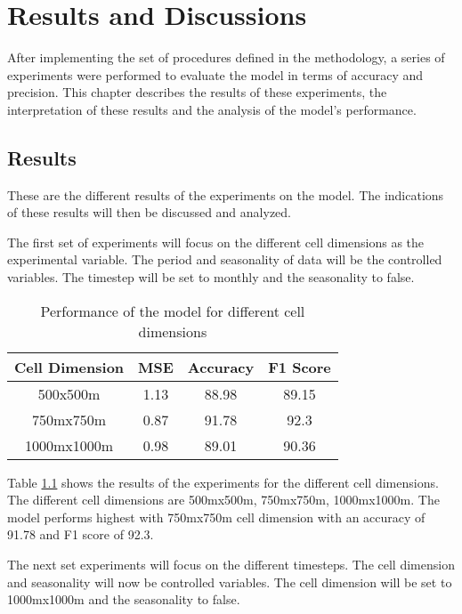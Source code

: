 \chapter{Results and Discussions}
    After implementing the set of procedures defined in the methodology, a series of experiments were performed to evaluate the model in terms of accuracy and precision. This chapter describes the results of these experiments, the interpretation of these results and the analysis of the model's performance.
\section{Results}
    These are the different results of the experiments on the model. The indications of these results will then be discussed and analyzed.

    The first set of experiments will focus on the different cell dimensions as the experimental variable. The period and seasonality of data will be the controlled variables. The timestep will be set to monthly and the seasonality to false.

    \begin{table}[H]
      \centering
      \begin{tabular}{|c|c|c|c|}
            \hline
          \textbf{Cell Dimension}  &\textbf{MSE}  &\textbf{Accuracy} &\textbf{F1 Score}\\ 
          \hline
          500x500m &1.13 &88.98 &89.15 \\
          750mx750m &0.87 &91.78 &92.3 \\
          1000mx1000m  &0.98 &89.01 &90.36 \\
          \hline
        \end{tabular}
      \caption{Performance of the model for different cell dimensions}
      \label{table:dimension-results}
    \end{table}
    Table \ref{table:dimension-results} shows the results of the experiments for the different cell dimensions. The different cell dimensions are 500mx500m, 750mx750m, 1000mx1000m. The model performs highest with 750mx750m cell dimension with an accuracy of 91.78 and F1 score of 92.3.

    The next set experiments will focus on the different timesteps. The cell dimension and seasonality will now be controlled variables. The cell dimension will be set to 1000mx1000m and the seasonality to false.

